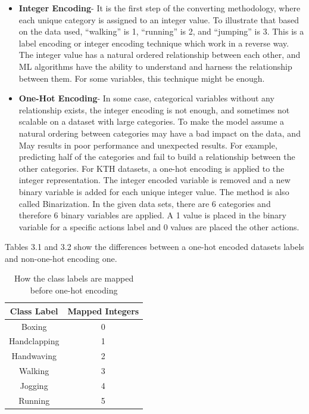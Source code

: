 \begin{itemize}
\item \textbf{Integer Encoding}- It is the first step of the converting methodology, where each unique category is assigned to an integer value. To illustrate that based on the data used, “walking” is 1, “running” is 2, and “jumping” is 3. This is a label encoding or integer encoding technique which work in a reverse way. The integer value has a natural ordered relationship between each other, and ML algorithms have the ability to understand and harness the relationship between them.  For some variables, this technique might be enough.
\item \textbf{One-Hot Encoding}- In some case, categorical variables without any relationship exists, the integer encoding is not enough, and sometimes not scalable on a dataset with large categories. To make the model assume a natural ordering between categories may have a bad impact on the data, and May results in poor performance and unexpected results. For example, predicting half of the categories and fail to build a relationship between the other categories. For KTH datasets, a one-hot encoding is applied to the integer representation. The integer encoded variable is removed and a new binary variable is added for each unique integer value. The method is also called Binarization. In the given data sets, there are 6 categories and therefore 6 binary variables are applied. A 1 value is placed in the binary variable for a specific actions label and 0 values are placed the other actions.
\end{itemize}

Tables 3.1 and 3.2 show the differences between a one-hot encoded datasets labels and non-one-hot encoding one.
\hspace{5mm} 
\begin{table}[]
\centering
\begin{tabular}{|c|c|}
\hline
\textbf{Class Label} & \textbf{Mapped Integers} \\ \hline
Boxing               & 0                        \\ \hline
Handclapping         & 1                        \\ \hline
Handwaving           & 2                        \\ \hline
Walking              & 3                        \\ \hline
Jogging              & 4                        \\ \hline
Running              & 5                        \\ \hline
\end{tabular}
\caption{How the class labels are mapped before one-hot encoding}
\label{my-label}
\end{table}

